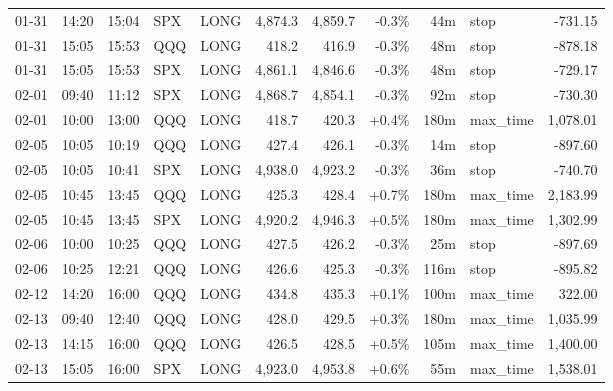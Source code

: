 \documentclass[11pt,a4paper,twoside]{article}
\begin{document}
\begin{center}
\begin{longtable}{>{\color{txtmain}}l l l l l r r r r >{\color{txtmain}}l r}
01-31 & 14:20 & 15:04 & SPX & LONG & 4,874.3 & 4,859.7 & \textcolor{lossred}{-0.3\%} & 44m & stop & \textcolor{lossred}{-731.15} \\
01-31 & 15:05 & 15:53 & QQQ & LONG & 418.2 & 416.9 & \textcolor{lossred}{-0.3\%} & 48m & stop & \textcolor{lossred}{-878.18} \\
01-31 & 15:05 & 15:53 & SPX & LONG & 4,861.1 & 4,846.6 & \textcolor{lossred}{-0.3\%} & 48m & stop & \textcolor{lossred}{-729.17} \\
02-01 & 09:40 & 11:12 & SPX & LONG & 4,868.7 & 4,854.1 & \textcolor{lossred}{-0.3\%} & 92m & stop & \textcolor{lossred}{-730.30} \\
02-01 & 10:00 & 13:00 & QQQ & LONG & 418.7 & 420.3 & \textcolor{wingreen}{+0.4\%} & 180m & max\_time & \textcolor{wingreen}{1,078.01} \\
02-05 & 10:05 & 10:19 & QQQ & LONG & 427.4 & 426.1 & \textcolor{lossred}{-0.3\%} & 14m & stop & \textcolor{lossred}{-897.60} \\
02-05 & 10:05 & 10:41 & SPX & LONG & 4,938.0 & 4,923.2 & \textcolor{lossred}{-0.3\%} & 36m & stop & \textcolor{lossred}{-740.70} \\
02-05 & 10:45 & 13:45 & QQQ & LONG & 425.3 & 428.4 & \textcolor{wingreen}{+0.7\%} & 180m & max\_time & \textcolor{wingreen}{2,183.99} \\
02-05 & 10:45 & 13:45 & SPX & LONG & 4,920.2 & 4,946.3 & \textcolor{wingreen}{+0.5\%} & 180m & max\_time & \textcolor{wingreen}{1,302.99} \\
02-06 & 10:00 & 10:25 & QQQ & LONG & 427.5 & 426.2 & \textcolor{lossred}{-0.3\%} & 25m & stop & \textcolor{lossred}{-897.69} \\
02-06 & 10:25 & 12:21 & QQQ & LONG & 426.6 & 425.3 & \textcolor{lossred}{-0.3\%} & 116m & stop & \textcolor{lossred}{-895.82} \\
02-12 & 14:20 & 16:00 & QQQ & LONG & 434.8 & 435.3 & \textcolor{wingreen}{+0.1\%} & 100m & max\_time & \textcolor{wingreen}{322.00} \\
02-13 & 09:40 & 12:40 & QQQ & LONG & 428.0 & 429.5 & \textcolor{wingreen}{+0.3\%} & 180m & max\_time & \textcolor{wingreen}{1,035.99} \\
02-13 & 14:15 & 16:00 & QQQ & LONG & 426.5 & 428.5 & \textcolor{wingreen}{+0.5\%} & 105m & max\_time & \textcolor{wingreen}{1,400.00} \\
02-13 & 15:05 & 16:00 & SPX & LONG & 4,923.0 & 4,953.8 & \textcolor{wingreen}{+0.6\%} & 55m & max\_time & \textcolor{wingreen}{1,538.01} \\

\end{longtable}
\end{center}
\end{document}
